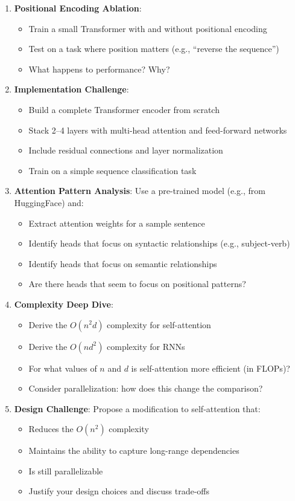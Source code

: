 \documentclass{article}
\begin{document}
\begin{enumerate}
\item \textbf{Positional Encoding Ablation}:
\begin{itemize}
\item Train a small Transformer with and without positional encoding
\item Test on a task where position matters (e.g., ``reverse the sequence'')
\item What happens to performance? Why?
\end{itemize}

\item \textbf{Implementation Challenge}:
\begin{itemize}
\item Build a complete Transformer encoder from scratch
\item Stack 2--4 layers with multi-head attention and feed-forward networks
\item Include residual connections and layer normalization
\item Train on a simple sequence classification task
\end{itemize}

\item \textbf{Attention Pattern Analysis}:
Use a pre-trained model (e.g., from HuggingFace) and:
\begin{itemize}
\item Extract attention weights for a sample sentence
\item Identify heads that focus on syntactic relationships (e.g., subject-verb)
\item Identify heads that focus on semantic relationships
\item Are there heads that seem to focus on positional patterns?
\end{itemize}

\item \textbf{Complexity Deep Dive}:
\begin{itemize}
\item Derive the $O(n^2 d)$ complexity for self-attention
\item Derive the $O(nd^2)$ complexity for RNNs
\item For what values of $n$ and $d$ is self-attention more efficient (in FLOPs)?
\item Consider parallelization: how does this change the comparison?
\end{itemize}

\item \textbf{Design Challenge}:
Propose a modification to self-attention that:
\begin{itemize}
\item Reduces the $O(n^2)$ complexity
\item Maintains the ability to capture long-range dependencies
\item Is still parallelizable
\item Justify your design choices and discuss trade-offs
\end{itemize}
\end{enumerate}
\end{document}

